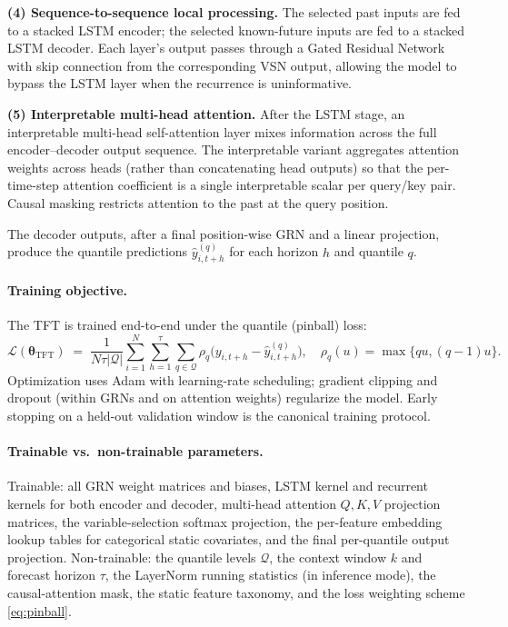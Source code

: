 \documentclass[11pt]{article}
\begin{document}
\textbf{(4) Sequence-to-sequence local processing.}  The selected past inputs are fed to a stacked LSTM encoder; the selected known-future inputs are fed to a stacked LSTM decoder.  Each layer's output passes through a Gated Residual Network with skip connection from the corresponding VSN output, allowing the model to bypass the LSTM layer when the recurrence is uninformative.

\textbf{(5) Interpretable multi-head attention.}  After the LSTM stage, an interpretable multi-head self-attention layer mixes information across the full encoder--decoder output sequence.  The interpretable variant aggregates attention weights across heads (rather than concatenating head outputs) so that the per-time-step attention coefficient is a single interpretable scalar per query/key pair.  Causal masking restricts attention to the past at the query position.

The decoder outputs, after a final position-wise GRN and a linear projection, produce the quantile predictions $\hat{y}_{i,t+h}^{(q)}$ for each horizon $h$ and quantile $q$.

\paragraph{Training objective.}  The TFT is trained end-to-end under the quantile (pinball) loss:
\begin{equation}
    \mathcal{L}(\bm{\theta}_{\text{TFT}}) \;=\; \frac{1}{N \tau |\mathcal{Q}|} \sum_{i=1}^{N} \sum_{h=1}^{\tau} \sum_{q \in \mathcal{Q}} \rho_q\!\bigl( y_{i,t+h} - \hat{y}_{i,t+h}^{(q)} \bigr), \quad
    \rho_q(u) = \max\{q u, (q-1) u\}.
\label{eq:pinball}
\end{equation}
Optimization uses Adam with learning-rate scheduling; gradient clipping and dropout (within GRNs and on attention weights) regularize the model.  Early stopping on a held-out validation window is the canonical training protocol.

\paragraph{Trainable vs.\ non-trainable parameters.}  Trainable: all GRN weight matrices and biases, LSTM kernel and recurrent kernels for both encoder and decoder, multi-head attention $Q, K, V$ projection matrices, the variable-selection softmax projection, the per-feature embedding lookup tables for categorical static covariates, and the final per-quantile output projection.  Non-trainable: the quantile levels $\mathcal{Q}$, the context window $k$ and forecast horizon $\tau$, the LayerNorm running statistics (in inference mode), the causal-attention mask, the static feature taxonomy, and the loss weighting scheme \eqref{eq:pinball}.
\end{document}
